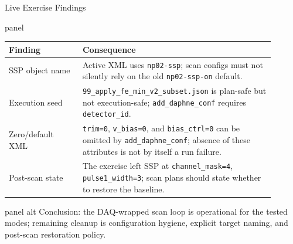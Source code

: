 \documentclass[aspectratio=169,10pt]{beamer}
\begin{document}
\begin{frame}[t]{Live Exercise Findings}
\begin{beamercolorbox}[wd=\linewidth,sep=4pt,rounded=true]{panel}
\scriptsize
\renewcommand{\arraystretch}{1.16}
\begin{tabular}{@{}>{\raggedright\arraybackslash}p{0.25\linewidth}>{\raggedright\arraybackslash}p{0.65\linewidth}@{}}
\toprule
\textbf{Finding} & \textbf{Consequence} \\
\midrule
SSP object name & Active XML uses \texttt{np02-ssp}; scan configs must not silently rely on the old \texttt{np02-ssp-on} default. \\
Execution seed & \texttt{99\_apply\_fe\_min\_v2\_subset.json} is plan-safe but not execution-safe; \texttt{add\_daphne\_conf} requires \texttt{detector\_id}. \\
Zero/default XML & \texttt{trim=0}, \texttt{v\_bias=0}, and \texttt{bias\_ctrl=0} can be omitted by \texttt{add\_daphne\_conf}; absence of these attributes is not by itself a run failure. \\
Post-scan state & The exercise left SSP at \texttt{channel\_mask=4}, \texttt{pulse1\_width=3}; scan plans should state whether to restore the baseline. \\
\bottomrule
\end{tabular}
\end{beamercolorbox}

\vspace{1.5mm}
\begin{beamercolorbox}[wd=\linewidth,sep=4pt,rounded=true]{panel alt}
\scriptsize
Conclusion: the DAQ-wrapped scan loop is operational for the tested modes; remaining cleanup is configuration hygiene, explicit target naming, and post-scan restoration policy.
\end{beamercolorbox}
\end{frame}
\end{document}
